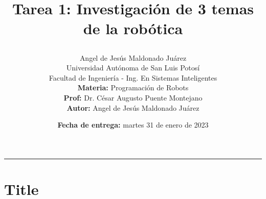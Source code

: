 \documentclass[a4paper, 12pt]{article}
\title{
    \vspace{-3cm}Tarea 1: Investigación de 3 temas de la robótica
    \author{
        Angel de Jesús Maldonado Juárez\\
        Universidad Autónoma de San Luis Potosí\\
        Facultad de Ingeniería - Ing. En Sistemas Inteligentes\\
        \textbf{Materia:} Programación de Robots\\
        \textbf{Prof:} Dr. César Augusto Puente Montejano\\
        \textbf{Autor:} Angel de Jesús Maldonado Juárez
    }
    \date{\textbf{Fecha de entrega:} martes 31 de enero de 2023}
}
\begin{document}
\maketitle

\hrule

\section*{Title}



\nocite{*}
\end{document}

